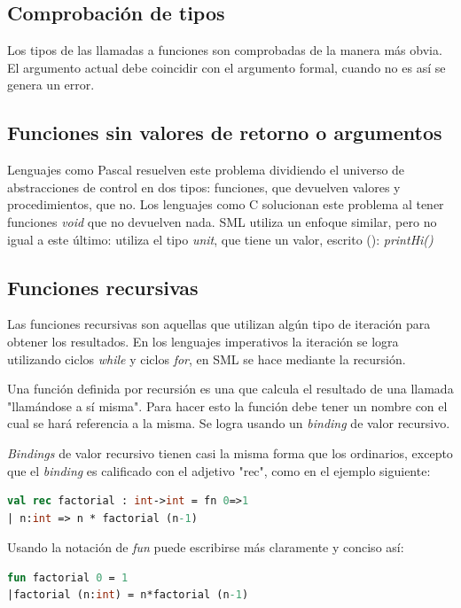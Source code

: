 \documentclass[10pt,journal,compsoc]{IEEEtran}
\begin{document}
\subsection{Comprobaci\'on de tipos}
Los tipos de las llamadas a funciones son comprobadas de la manera m\'as obvia. El argumento actual debe coincidir con el argumento formal, cuando no es as\'i se genera un error.

\subsection{Funciones sin valores de retorno o argumentos}
Lenguajes como Pascal resuelven este problema dividiendo el universo de abstracciones de control en dos tipos: funciones, que devuelven valores y procedimientos, que no. Los lenguajes como C solucionan este problema al tener funciones \textit{void} que no devuelven nada. SML utiliza un enfoque similar, pero no igual a este \'ultimo: utiliza el tipo \textit{unit}, que tiene un valor, escrito (): \textit{printHi()}

\subsection{Funciones recursivas}
Las funciones recursivas son aquellas que utilizan alg\'un tipo de iteraci\'on para obtener los resultados. En los lenguajes imperativos la iteraci\'on se logra utilizando ciclos \textit{while} y ciclos \textit{for}, en SML se hace mediante la recursi\'on.

Una funci\'on definida por recursi\'on es una que calcula el resultado de una llamada "llam\'andose a s\'i misma". Para hacer esto la funci\'on debe tener un nombre con el cual se har\'a referencia a la misma. Se logra usando un \textit{binding} de valor recursivo.

\textit{Bindings} de valor recursivo tienen casi la misma forma que los ordinarios, excepto que el \textit{binding} es calificado con el adjetivo "rec", como en el ejemplo siguiente:

\begin{lstlisting}[language=ML, caption=Ejemplo Factorial Recursivo]
val rec factorial : int->int = fn 0=>1
| n:int => n * factorial (n-1)
\end{lstlisting}

Usando la notaci\'on de \textit{fun} puede escribirse m\'as claramente y conciso as\'i:

\begin{lstlisting}[language=ML, caption=Ejemplo Factorial Recursivo Fun]
fun factorial 0 = 1
|factorial (n:int) = n*factorial (n-1)
\end{lstlisting}
\end{document}
